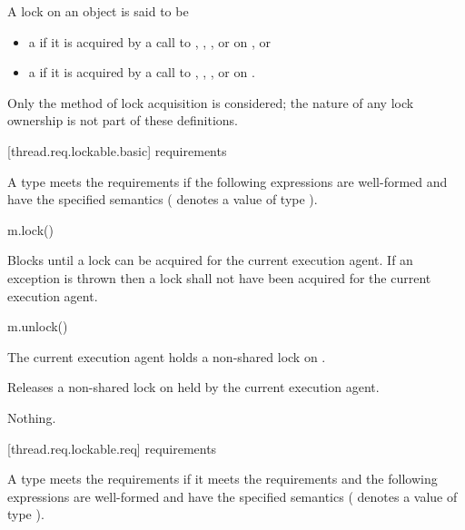 \pnum
A lock on an object  is said to be
\begin{itemize}
\item
a  if it is acquired by a call to
,
,
, or
 on , or
\item
a  if it is acquired by a call to
,
,
, or
 on .
\end{itemize}
\begin{note}
Only the method of lock acquisition is considered;
the nature of any lock ownership is not part of these definitions.
\end{note}

[thread.req.lockable.basic]{ requirements}

\pnum
A type  meets the  requirements if the following expressions are
well-formed and have the specified semantics ( denotes a value of type ).

\begin{itemdecl}
m.lock()
\end{itemdecl}

\begin{itemdescr}
\pnum
{}%
\effects
Blocks until a lock can be acquired for the current execution agent. If an exception
is thrown then a lock shall not have been acquired for the current execution agent.
\end{itemdescr}

\begin{itemdecl}
m.unlock()
\end{itemdecl}

\begin{itemdescr}
\pnum
\expects
The current execution agent holds a non-shared lock on .

\pnum
\effects
Releases a non-shared lock on  held by the current execution agent.

\pnum
\throws
Nothing.
\end{itemdescr}

[thread.req.lockable.req]{ requirements}

\pnum
A type  meets the  requirements if it meets the 
requirements and the following expressions are well-formed and have the specified semantics
( denotes a value of type ).

